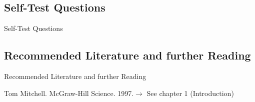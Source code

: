 \subsection{Self-Test Questions}

\begin{frame}{Self-Test Questions}{}

\end{frame}


\subsection{Recommended Literature and further Reading}

\begin{frame}{Recommended Literature and further Reading}{}
	\footnotesize
	\begin{thebibliography}{2}
			{Tom Mitchell. McGraw-Hill Science. 1997.}{$\rightarrow$ See chapter 1 (Introduction)}
	\end{thebibliography}
\end{frame}


\makethanks


%
%
%	


